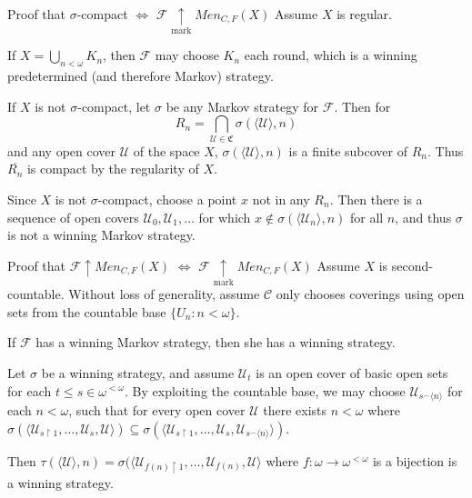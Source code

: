 \documentclass{beamer}
\theoremstyle{definition}
\newcommand{\win}{\uparrow}
\newcommand{\markwin}{\underset{\text{mark}}{\uparrow}}
\newcommand{\menGame}[1]{Men_{C,F}\left({#1}\right)}
\newcommand{\concat}{{^\frown}}
\newcommand{\rest}{\restriction}
\newcommand{\cl}[1]{\overline{#1}}
\newcommand{\<}{\langle}
\renewcommand{\>}{\rangle}
\newcommand{\mc}[1]{\mathcal{#1}}
\newcommand{\pl}[1]{\mathscr{#1}}
\begin{document}
\begin{frame}{
Proof that $\sigma$-compact $\Leftrightarrow$ $\pl F\markwin\menGame{X}$
}\small
  Assume $X$ is regular.

  \vpause

  If $X=\bigcup_{n<\omega} K_n$, then $\pl F$ may choose $K_n$ each round,
  which is a winning predetermined (and therefore Markov) strategy.

  \vpause

  If $X$ is not $\sigma$-compact,
  let $\sigma$ be any Markov strategy for $\pl F$. Then for
    \[
      R_n = \bigcap_{\mc{U}\in\mathfrak{C}} \sigma(\<\mc{U}\>,n)
    \]
  and any open cover $\mc U$ of the space $X$,
  $\sigma(\<\mc{U}\>,n)$ is a finite subcover of $R_n$. Thus $\cl{R_n}$
  is compact by the regularity of $X$.

  \vpause

  Since $X$ is not $\sigma$-compact, choose a point $x$ not in any $R_n$.
  Then there is a sequence of open covers $\mc U_0,\mc U_1,\dots$ for which
  $x\not\in\sigma(\<\mc U_n\>,n)$ for all $n$, and thus $\sigma$
  is not a winning Markov strategy.
\end{frame}

\begin{frame}{
Proof that $\pl F\win\menGame{X}$ $\Leftrightarrow$ $\pl F\markwin\menGame{X}$
}\small
  Assume $X$ is second-countable. Without loss of generality, assume
  $\pl C$ only chooses coverings using open sets from the countable base
  $\{U_n:n<\omega\}$.

  \vpause

  If $\pl F$ has a winning Markov strategy, then she has a winning strategy.

  \vpause

  Let $\sigma$ be a winning strategy, and assume $\mc U_t$ is an open cover
  of basic open sets for each $t\leq s\in\omega^{<\omega}$.
  By exploiting the countable base, we may choose
  $\mc U_{s\concat\<n\>}$ for each $n<\omega$, such that for every open cover
  $\mc U$ there exists $n<\omega$ where
  $
    \sigma(\<\mc U_{s\rest1},\dots,\mc U_{s},\mc U\>)
      \subseteq
    \sigma(\<\mc U_{s\rest1},\dots,\mc U_{s},\mc U_{s\concat\<n\>}\>)
  $.

  \vpause

  Then
  $\tau(\<\mc U\>,n)=\sigma(\<\mc U_{f(n)\rest1},\dots,\mc U_{f(n)},\mc U\>$
  where $f:\omega\to\omega^{<\omega}$ is a bijection is a winning strategy.
\end{frame}
\end{document}
